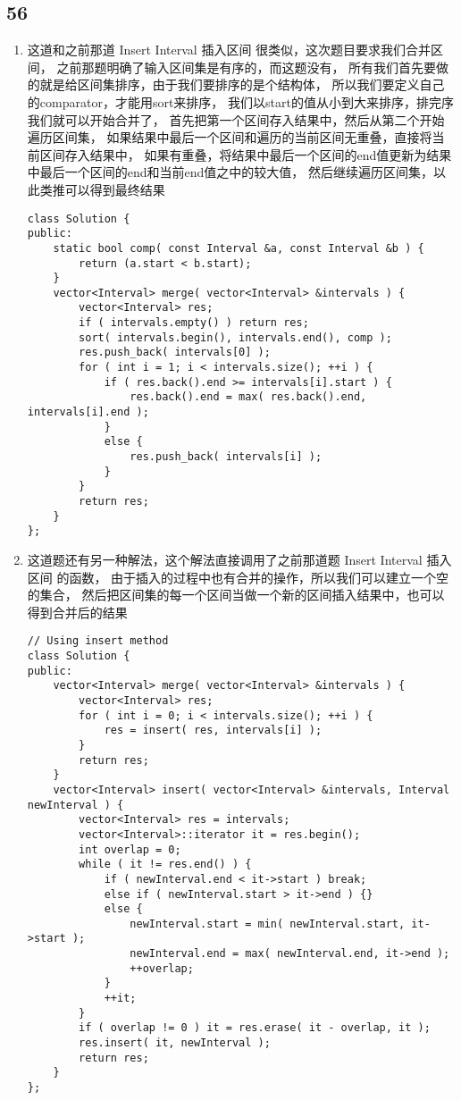 \documentclass[12pt,a4paper]{article}
\begin{document}
\subsection{56}
\begin{enumerate}
\item
\begin{CJK}{UTF8}{gbsn}
这道和之前那道 Insert Interval 插入区间 很类似，这次题目要求我们合并区间，
之前那题明确了输入区间集是有序的，而这题没有，
所有我们首先要做的就是给区间集排序，由于我们要排序的是个结构体，
所以我们要定义自己的comparator，才能用sort来排序，
我们以start的值从小到大来排序，排完序我们就可以开始合并了，
首先把第一个区间存入结果中，然后从第二个开始遍历区间集，
如果结果中最后一个区间和遍历的当前区间无重叠，直接将当前区间存入结果中，
如果有重叠，将结果中最后一个区间的end值更新为结果中最后一个区间的end和当前end值之中的较大值，
然后继续遍历区间集，以此类推可以得到最终结果
\end{CJK}
\begin{lstlisting}
class Solution {
public:
	static bool comp( const Interval &a, const Interval &b ) {
		return (a.start < b.start);
	}
	vector<Interval> merge( vector<Interval> &intervals ) {
		vector<Interval> res;
		if ( intervals.empty() ) return res;
		sort( intervals.begin(), intervals.end(), comp );
		res.push_back( intervals[0] );
		for ( int i = 1; i < intervals.size(); ++i ) {
			if ( res.back().end >= intervals[i].start ) {
				res.back().end = max( res.back().end, intervals[i].end );
			}
			else {
				res.push_back( intervals[i] );
			}
		}
		return res;
	}
};
\end{lstlisting}
\item
\begin{CJK}{UTF8}{gbsn}
这道题还有另一种解法，这个解法直接调用了之前那道题 Insert Interval 插入区间 的函数，
由于插入的过程中也有合并的操作，所以我们可以建立一个空的集合，
然后把区间集的每一个区间当做一个新的区间插入结果中，也可以得到合并后的结果
\end{CJK}
\begin{lstlisting}
// Using insert method
class Solution {
public:
	vector<Interval> merge( vector<Interval> &intervals ) {
		vector<Interval> res;
		for ( int i = 0; i < intervals.size(); ++i ) {
			res = insert( res, intervals[i] );
		}
		return res;
	}
	vector<Interval> insert( vector<Interval> &intervals, Interval newInterval ) {
		vector<Interval> res = intervals;
		vector<Interval>::iterator it = res.begin();
		int overlap = 0;
		while ( it != res.end() ) {
			if ( newInterval.end < it->start ) break;
			else if ( newInterval.start > it->end ) {}
			else {
				newInterval.start = min( newInterval.start, it->start );
				newInterval.end = max( newInterval.end, it->end );
				++overlap;
			}
			++it;
		}
		if ( overlap != 0 ) it = res.erase( it - overlap, it );
		res.insert( it, newInterval );
		return res;
	}
};
\end{lstlisting}
\end{enumerate}
\end{document}
